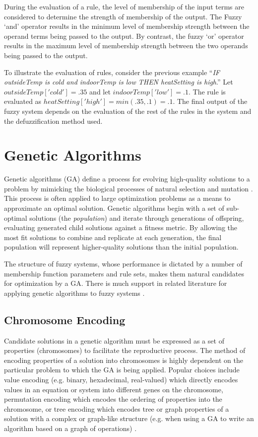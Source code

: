 \documentclass[12pt]{report}
\begin{document}
During the evaluation of a rule, the level of membership of the input terms are considered to determine the strength of membership of the output. The Fuzzy `and' operator results in the minimum level of membership strength between the operand terms being passed to the output. By contrast, the fuzzy `or' operator results in the maximum level of membership strength between the two operands being passed to the output.

To illustrate the evaluation of rules, consider the previous example ``\emph{IF outsideTemp is cold and indoorTemp is low THEN heatSetting is high}.'' Let $outsideTemp['cold'] = .35$ and let $indoorTemp['low'] = .1$. The rule is evaluated as $heatSetting['high']=min(.35, .1)=.1$. The final output of the fuzzy system depends on the evaluation of the rest of the rules in the system and the defuzzification method used.

\section{Genetic Algorithms}
Genetic algorithms (GA) define a process for evolving high-quality solutions to a problem by mimicking the biological processes of natural selection and mutation \cite{holland1992genetic}. This process is often applied to large optimization problems as a means to approximate an optimal solution. Genetic algorithms begin with a set of sub-optimal solutions (the \emph{population}) and iterate through generations of offspring, evaluating generated child solutions against a fitness metric. By allowing the most fit solutions to combine and replicate at each generation, the final population will represent higher-quality solutions than the initial population.

 The structure of fuzzy systems, whose performance is dictated by a number of membership function parameters and rule sets, makes them natural candidates for optimization by a GA. There is much support in related literature for applying genetic algorithms to fuzzy systems \cite{seng1999tuning, karr1991applying, takagi1993neural}.

\subsection{Chromosome Encoding}
Candidate solutions in a genetic algorithm must be expressed as a set of properties (chromosomes) to facilitate the reproductive process. The method of encoding properties of a solution into chromosomes is highly dependent on the particular problem to which the GA is being applied. Popular choices include value encoding (e.g. binary, hexadecimal, real-valued) which directly encodes  values in an equation or system into different genes on the chromosome, permutation encoding which encodes the ordering of properties into the chromosome, or tree encoding which encodes tree or graph properties of a solution with a complex or graph-like structure (e.g. when using a GA to write an algorithm based on a graph of operations) \cite{kumar2013encoding}.
\end{document}
